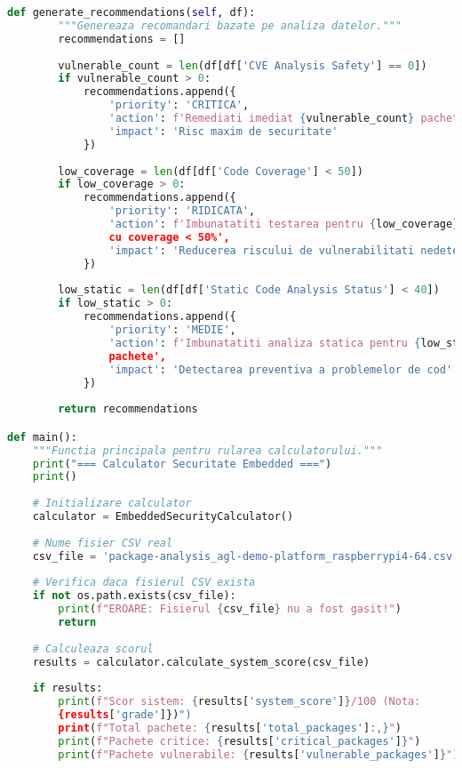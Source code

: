 \documentclass[12pt,a4paper]{article}
\begin{document}
\begin{lstlisting}[language=Python, caption=Script real pentru calcularea scorului de securitate (security\_calculator.py), label=lst:real_security_calculator]
    def generate_recommendations(self, df):
        """Genereaza recomandari bazate pe analiza datelor."""
        recommendations = []
        
        vulnerable_count = len(df[df['CVE Analysis Safety'] == 0])
        if vulnerable_count > 0:
            recommendations.append({
                'priority': 'CRITICA',
                'action': f'Remediati imediat {vulnerable_count} pachete cu CVE Score = 0',
                'impact': 'Risc maxim de securitate'
            })
        
        low_coverage = len(df[df['Code Coverage'] < 50])
        if low_coverage > 0:
            recommendations.append({
                'priority': 'RIDICATA',
                'action': f'Imbunatatiti testarea pentru {low_coverage} pachete 
                cu coverage < 50%',
                'impact': 'Reducerea riscului de vulnerabilitati nedetectate'
            })
        
        low_static = len(df[df['Static Code Analysis Status'] < 40])
        if low_static > 0:
            recommendations.append({
                'priority': 'MEDIE',
                'action': f'Imbunatatiti analiza statica pentru {low_static} 
                pachete',
                'impact': 'Detectarea preventiva a problemelor de cod'
            })
        
        return recommendations

def main():
    """Functia principala pentru rularea calculatorului."""
    print("=== Calculator Securitate Embedded ===")
    print()
    
    # Initializare calculator
    calculator = EmbeddedSecurityCalculator()
    
    # Nume fisier CSV real
    csv_file = 'package-analysis_agl-demo-platform_raspberrypi4-64.csv'
    
    # Verifica daca fisierul CSV exista
    if not os.path.exists(csv_file):
        print(f"EROARE: Fisierul {csv_file} nu a fost gasit!")
        return
    
    # Calculeaza scorul
    results = calculator.calculate_system_score(csv_file)
    
    if results:
        print(f"Scor sistem: {results['system_score']}/100 (Nota:
        {results['grade']})")
        print(f"Total pachete: {results['total_packages']:,}")
        print(f"Pachete critice: {results['critical_packages']}")
        print(f"Pachete vulnerabile: {results['vulnerable_packages']}")
        

\end{lstlisting}
\end{document}
